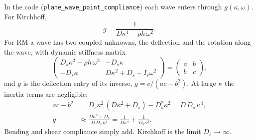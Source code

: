 In the code (\texttt{plane\_wave\_point\_compliance}) each wave enters through
$g(\kappa, \omega)$. For Kirchhoff,
\begin{equation}
  g = \frac{1}{D\kappa^4 - \rho h\,\omega^2} .
\end{equation}
For RM a wave has two coupled unknowns, the deflection and the rotation along
the wave, with dynamic stiffness matrix
\begin{equation}
  \begin{pmatrix}
    D_s\kappa^2 - \rho h\,\omega^2 & -D_s\kappa \\
    -D_s\kappa & D\kappa^2 + D_s - I_r\omega^2
  \end{pmatrix}
  =
  \begin{pmatrix} a & b \\ b & c \end{pmatrix} ,
\end{equation}
and $g$ is the deflection entry of its inverse, $g = c/(ac - b^2)$. At large
$\kappa$ the inertia terms are negligible:
\begin{align}
  ac - b^2 &= D_s\kappa^2\,(D\kappa^2 + D_s) - D_s^2\kappa^2 = D\,D_s\,\kappa^4 , \\
  g &\approx \frac{D\kappa^2 + D_s}{D\,D_s\,\kappa^4}
     = \frac{1}{D\kappa^4} + \frac{1}{D_s\kappa^2} .
\end{align}
Bending and shear compliance simply add. Kirchhoff is the limit
$D_s \to \infty$.

